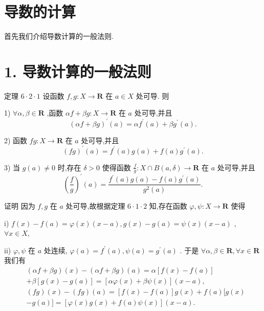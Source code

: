 \section{导数的计算}

首先我们介绍导数计算的一般法则.

\section*{1. 导数计算的一般法则}

定理 $6 \cdot  2 \cdot  1$ 设函数 $f,g : X \rightarrow  \mathbf{R}$ 在 $a \in  X$ 处可导. 则

1) $\forall \alpha ,\beta  \in  \mathbf{R}$ ,函数 ${\alpha f} + {\beta g} : X \rightarrow  \mathbf{R}$ 在 $a$ 处可导,并且
$${\left( \alpha f + \beta g\right) }^{\prime }\left( a\right)  = \alpha {f}^{\prime }\left( a\right)  + \beta {g}^{\prime }\left( a\right) .$$

2) 函数 ${fg} : X \rightarrow  \mathbf{R}$ 在 $a$ 处可导,并且
$${\left( fg\right) }^{\prime }\left( a\right)  = {f}^{\prime }\left( a\right) g\left( a\right)  + f\left( a\right) {g}^{\prime }\left( a\right) .$$

3) 当 $g\left( a\right)  \neq  0$ 时,存在 $\delta  > 0$ 使得函数 $\frac{f}{g} : X \cap  B\left( {a,\delta }\right)  \rightarrow  \mathbf{R}$ 在 $a$ 处可导,并且
$${\left( \frac{f}{g}\right) }^{\prime }\left( a\right)  = \frac{{f}^{\prime }\left( a\right) g\left( a\right)  - f\left( a\right) {g}^{\prime }\left( a\right) }{{g}^{2}\left( a\right) }.$$

证明 因为 $f,g$ 在 $a$ 处可导,故根据定理 $6 \cdot  1 \cdot  2$ 知,存在函数 $\varphi ,\psi  : X \rightarrow  \mathbf{R}$ 使得

i) $f\left( x\right)  - f\left( a\right)  = \varphi \left( x\right) \left( {x - a}\right) ,g\left( x\right)  - g\left( a\right)  = \psi \left( x\right) \left( {x - a}\right)$ , $\forall x \in  X,$

ii) $\varphi ,\psi$ 在 $a$ 处连续, $\varphi \left( a\right)  = {f}^{\prime }\left( a\right) ,\psi \left( a\right)  = {g}^{\prime }\left( a\right)$ . 于是 $\forall \alpha ,\beta  \in  \mathbf{R},\forall x \in  \mathbf{R}$ 我们有
\begin{align*}
	&\left( {{\alpha f} + {\beta g}}\right) \left( x\right)  - \left( {{\alpha f} + {\beta g}}\right) \left( a\right)  = \alpha \left\lbrack  {f\left( x\right)  - f\left( a\right) }\right\rbrack\\
	&+ \beta \left\lbrack  {g\left( x\right)  - g\left( a\right) }\right\rbrack   = \left\lbrack  {{\alpha \varphi }\left( x\right)  + {\beta \psi }\left( x\right) }\right\rbrack  \left( {x - a}\right) ,\\
	&\left( {fg}\right) \left( x\right)  - \left( {fg}\right) \left( a\right)  = \left\lbrack  {f\left( x\right)  - f\left( a\right) }\right\rbrack  g\left( x\right)  + f\left( a\right) \lbrack g\left( x\right)\\
	&- g\left( a\right) \rbrack  = \left\lbrack  {\varphi \left( x\right) g\left( x\right)  + f\left( a\right) \psi \left( x\right) }\right\rbrack  \left( {x - a}\right) .
\end{align*}

